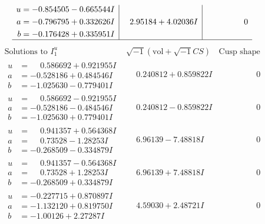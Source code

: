 \documentclass[1p]{elsarticle_modified}
\theoremstyle{definition}
\newcommand{\I}{\sqrt{-1}}
\begin{document}
$$\begin{array}{c|c|c}
\begin{aligned}
u &= -0.854505 - 0.665544 I \\
a &= -0.796795 + 0.332626 I \\
b &= -0.176428 + 0.335951 I\end{aligned}
 & \phantom{-}2.95184 + 4.02036 I & \phantom{-0.000000 } 0\\
 \hline 
 \end{array}$$\newpage$$\begin{array}{c|c|c}  
\text{Solutions to }I^u_{1}& \I (\text{vol} + \sqrt{-1}CS) & \text{Cusp shape}\\
 \hline 
\begin{aligned}
u &= \phantom{-}0.586692 + 0.921955 I \\
a &= -0.528186 + 0.484546 I \\
b &= -1.025630 - 0.779401 I\end{aligned}
 & \phantom{-}0.240812 + 0.859822 I & \phantom{-0.000000 } 0 \\ \hline\begin{aligned}
u &= \phantom{-}0.586692 - 0.921955 I \\
a &= -0.528186 - 0.484546 I \\
b &= -1.025630 + 0.779401 I\end{aligned}
 & \phantom{-}0.240812 - 0.859822 I & \phantom{-0.000000 } 0 \\ \hline\begin{aligned}
u &= \phantom{-}0.941357 + 0.564368 I \\
a &= \phantom{-}0.73528 - 1.28253 I \\
b &= -0.268509 - 0.334879 I\end{aligned}
 & \phantom{-}6.96139 - 7.48818 I & \phantom{-0.000000 } 0 \\ \hline\begin{aligned}
u &= \phantom{-}0.941357 - 0.564368 I \\
a &= \phantom{-}0.73528 + 1.28253 I \\
b &= -0.268509 + 0.334879 I\end{aligned}
 & \phantom{-}6.96139 + 7.48818 I & \phantom{-0.000000 } 0 \\ \hline\begin{aligned}
u &= -0.227715 + 0.870897 I \\
a &= -1.132120 + 0.819750 I \\
b &= -1.00126 + 2.27287 I\end{aligned}
 & \phantom{-}4.59030 + 2.48721 I & \phantom{-0.000000 } 0 \\ \hline\begin{aligned}

\end{aligned}
\end{array}$$
\end{document}
